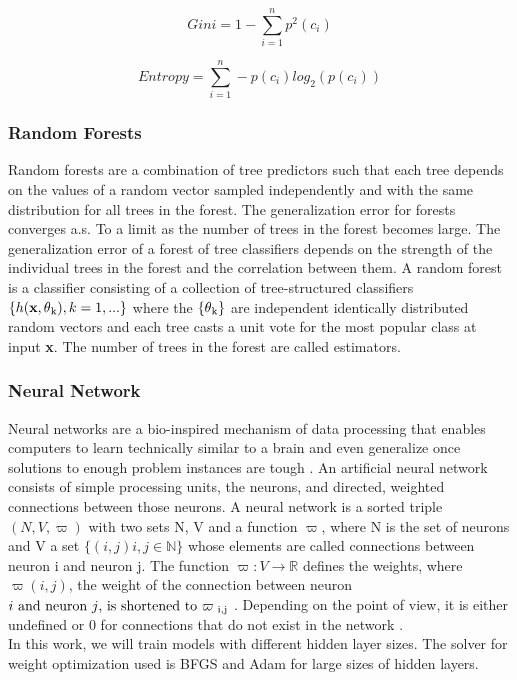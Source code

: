 \begin{equation}
Gini = 1 - \sum_{i=1}^{n} p^{2}(c_{i})
\label{eq:gini}
\end{equation}

\begin{equation}
Entropy = \sum_{i=1}^{n} -p(c_{i}) log_{2}(p(c_{i}))
\label{eq:entropy}
\end{equation}


\subsubsection{Random Forests}
\label{subsub:random_forests}
Random forests are a combination of tree predictors such that each tree depends on the values of a random vector sampled independently and with the same distribution for all trees in the forest\cite{Breiman2001}. The generalization error for forests converges a.s. To a limit as the number of trees in the forest becomes large. The generalization error of a forest of tree classifiers depends on the strength of the individual trees in the forest and the correlation between them.
A random forest is a classifier consisting of a collection of tree-structured
classifiers \(\{h(\textbf{x}, \theta \textsubscript{k} ), k = 1,...\}\) where the \( \{ \theta \textsubscript{k} \}\) are independent identically distributed
random vectors and each tree casts a unit vote for the most popular class at input \textbf{x}\cite{Breiman2001}.
The number of trees in the forest are called estimators.

\subsubsection{Neural Network}
\label{subsub:neural_network}
Neural networks are a bio-inspired mechanism of data processing that enables computers to learn technically similar to a brain and even generalize once solutions to enough problem instances are tough \cite{Kriesel2007NeuralNetworks}. An artificial neural network consists of simple processing units, the neurons, and directed, weighted connections between those neurons. A neural network is a sorted triple \((N, V, \varpi )\) with two sets N, V and a function \(\varpi\), where N is the set of neurons and V a set \(\{ (i, j) i, j \in \mathbb{N} \}\) whose elements are called connections between neuron i and neuron j. The function \( \varpi : V \rightarrow \mathbb{R}\) defines the weights, where \(\varpi(i, j)\), the weight of the connection between neuron \(i$ and neuron \(j$, is shortened to \(\varpi \textsubscript{ i,j}\) . Depending on the point of view, it is either undefined or 0 for connections that do not exist in the network \cite{Kriesel2007NeuralNetworks}. \\
In this work, we will train models with different hidden layer sizes. The solver for weight optimization used is BFGS\cite{Dai2013} and Adam\cite{adamNN} for large sizes of hidden layers.

